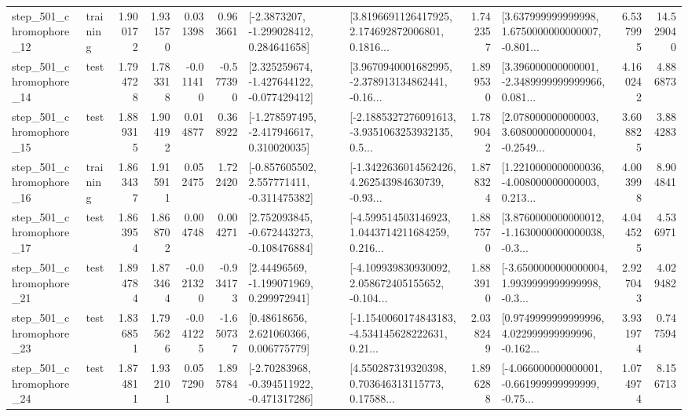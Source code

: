 \begin{tabular}{llrrrrllrlrr}
  step\_501\_chromophore\_12 &  training &      1.900172 &    1.931570 &      0.031398 &  0.963661 &     [-2.3873207, -1.299028412, 0.284641658] &  [3.8196691126417925, 2.174692872006801, 0.1816... &       1.742357 &  [3.637999999999998, 1.6750000000000007, -0.801... &            6.537995 &         14.529040 \\
  step\_501\_chromophore\_14 &      test &      1.794728 &    1.783318 &     -0.011410 & -0.577390 &   [2.325259674, -1.427644122, -0.077429412] &  [3.9670940001682995, -2.378913134862441, -0.16... &       1.899530 &  [3.396000000000001, -2.3489999999999966, 0.081... &            4.160242 &          4.886873 \\
  step\_501\_chromophore\_15 &      test &      1.889315 &    1.904192 &      0.014877 &  0.368922 &   [-1.278597495, -2.417946617, 0.310020035] &  [-2.1885327276091613, -3.9351063253932135, 0.5... &       1.789042 &  [2.078000000000003, 3.608000000000004, -0.2549... &            3.608825 &          3.884283 \\
  step\_501\_chromophore\_16 &  training &      1.863437 &    1.915911 &      0.052475 &  1.722420 &   [-0.857605502, 2.557771411, -0.311475382] &  [-1.3422636014562426, 4.262543984630739, -0.93... &       1.878324 &  [1.2210000000000036, -4.008000000000003, 0.213... &            4.003998 &          8.904841 \\
  step\_501\_chromophore\_17 &      test &      1.863954 &    1.868702 &      0.004748 &  0.004271 &   [2.752093845, -0.672443273, -0.108476884] &  [-4.599514503146923, 1.0443714211684259, 0.216... &       1.887570 &  [3.8760000000000012, -1.1630000000000038, -0.3... &            4.044525 &          4.536971 \\
  step\_501\_chromophore\_21 &      test &      1.894784 &    1.873464 &     -0.021320 & -0.934173 &     [2.44496569, -1.199071969, 0.299972941] &  [-4.109939830930092, 2.058672405155652, -0.104... &       1.883910 &  [-3.6500000000000004, 1.9939999999999998, -0.3... &            2.927043 &          4.029482 \\
  step\_501\_chromophore\_23 &      test &      1.836851 &    1.795626 &     -0.041225 & -1.650737 &      [0.48618656, 2.621060366, 0.006775779] &  [-1.1540060174843183, -4.534145628222631, 0.21... &       2.038249 &  [0.9749999999999996, 4.022999999999996, -0.162... &            3.931974 &          0.747594 \\
  step\_501\_chromophore\_24 &      test &      1.874811 &    1.932101 &      0.057290 &  1.895784 &   [-2.70283968, -0.394511922, -0.471317286] &  [4.550287319320398, 0.703646313115773, 0.17588... &       1.896288 &  [-4.066000000000001, -0.661999999999999, -0.75... &            1.074974 &          8.156713 \\

\end{tabular}

